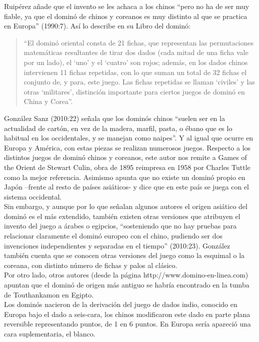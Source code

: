Ruipérez añade que el invento se les achaca a los chinos “pero no ha de ser muy fiable, ya que el
dominó de chinos y coreanos es muy distinto al que se practica en Europa” (1990:7). Así lo describe
en su Libro del dominó: \\

\begin{quote}
“El dominó oriental consta de 21 fichas, que representan las permutaciones matemáticas resultantes
de tirar dos dados (cada mitad de una ficha vale por un lado), el ‘uno’ y el ‘cuatro’ son rojos;
además, en los dados chinos intervienen 11 fichas repetidas, con lo que suman un total de 32 fichas
el conjunto de, y para, este juego. Las fichas repetidas se llaman ‘civiles’ y las otras ‘militares’,
distinción importante para ciertos juegos de dominó en China y Corea”.
\end{quote}

González Sanz (2010:22) señala que los dominós chinos “suelen ser en la actualidad de cartón, en vez
de la madera, marfil, pasta, o ébano que es lo habitual en los occidentales, y se manejan como naipes”.
Y al igual que ocurre en Europa y América, con estas piezas se realizan numerosos juegos. Respecto a
los distintos juegos de dominó chinos y coreanos, este autor nos remite a Games of the Orient de Stewart
Culin, obra de 1895 reimpresa en 1958 por Charles Tuttle como la mejor referencia. Asimismo apunta que
no existe un dominó propio en Japón –frente al resto de países asiáticos- y dice que en este país se
juega con el sistema occidental. \\

Sin embargo, y aunque por lo que señalan algunos autores el origen asiático del dominó es el más
extendido, también existen otras versiones que atribuyen el invento del juego a árabes o egipcios,
“sosteniendo que no hay pruebas para relacionar claramente el dominó europeo con el chino, pudiendo
ser dos invenciones independientes y separadas en el tiempo” (2010:23). González también cuenta que
se conocen otras versiones del juego como la esquimal o la coreana, con distinto número de fichas
y palos al clásico. \\

Por otro lado, otros autores (desde la página http://www.domino-en-linea.com) apuntan que el dominó
de origen más antiguo se habría encontrado en la tumba de Touthankamon en Egipto. \\

Los dominós nacieron de la derivación del juego de dados indio, conocido en Europa bajo el dado a
seis-cara, los chinos modificaron este dado en parte plana reversible representando puntos, de 1
en 6 puntos. En Europa sería apareció una cara suplementaria, el blanco. \\

